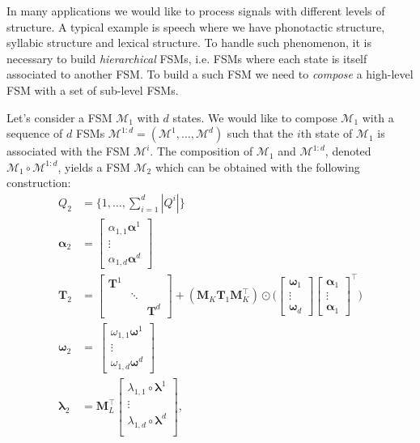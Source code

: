 In many applications we would like to process signals with different levels of
structure. A typical example is speech where we have phonotactic
structure, syllabic structure and lexical structure. To handle such
phenomenon, it is necessary to build \emph{hierarchical} FSMs, i.e.
FSMs where each state is itself associated to another FSM. To build a
such FSM we need to \emph{compose} a high-level FSM with a set of
sub-level FSMs.

Let's consider a FSM $\mathcal{M}_1$ with $d$ states. We would like to
compose $\mathcal{M}_1$ with a sequence of $d$ FSMs $\mathcal{M}^{1:d} = (\mathcal{M}^1, \dots, \mathcal{M}^d)$
such that the $i$th state of $\mathcal{M}_1$ is associated with the
FSM $\mathcal{M}^i$. The composition of $\mathcal{M}_1$ and $\mathcal{M}^{1:d}$,
denoted $\mathcal{M}_1 \circ \mathcal{M}^{1:d}$, yields a FSM $\mathcal{M}_2$
which can be obtained with the following construction:
\begin{align}
    Q_2 &= \{1, \dots, \sum_{i=1}^d |Q^i| \} \\
    \boldsymbol{\alpha}_2 &=
        \begin{bmatrix}
            \alpha_{1,1} \boldsymbol{\alpha}^1 \\
            \vdots \\
            \alpha_{1,d} \boldsymbol{\alpha}^d
        \end{bmatrix} \\
    \mathbf{T}_2 &= \begin{bmatrix}
        \mathbf{T}^1 & & \\
        & \ddots & \\
        & & \mathbf{T}^d
    \end{bmatrix} + (\mathbf{M}_K \mathbf{T}_1 \mathbf{M}_K^\top) \odot
        \Bigg( \begin{bmatrix}
            \boldsymbol{\omega}_1 \\
            \vdots \\
            \boldsymbol{\omega}_d
        \end{bmatrix} \begin{bmatrix}
            \boldsymbol{\alpha}_1\\
            \vdots \\
            \boldsymbol{\alpha}_1
        \end{bmatrix}^\top \Bigg)  \\
    \boldsymbol{\omega}_2 &= \
        \begin{bmatrix}
            \omega_{1,1} \boldsymbol{\omega}^1 \\
            \vdots \\
            \omega_{1,d} \boldsymbol{\omega}^d
        \end{bmatrix} \\
    \boldsymbol{\lambda}_2 &= \mathbf{M}_L^\top \begin{bmatrix}
        \lambda_{1,1} \circ \boldsymbol{\lambda}^1 \\
        \vdots \\
        \lambda_{1,d} \circ \boldsymbol{\lambda}^d \\
    \end{bmatrix},
\end{align}
